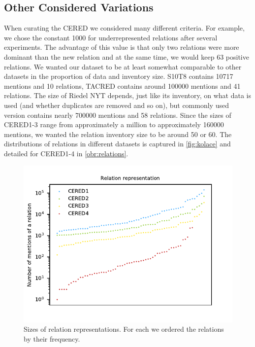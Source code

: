 \subsection{Other Considered Variations}
\label{sec:otherconsideredvariations}
When curating the CERED we considered many different criteria. For example, we chose the constant \num{1000} for underrepresented relations after several experiments. The advantage of this value is that only two relations were more dominant than the new  relation and at the same time, we would keep 63 positive relations. We wanted our dataset to be at least somewhat comparable to other datasets in the proportion of data and inventory size. S10T8 contains \num{10717} mentions and 10 relations, TACRED contains around \num{100000} mentions and 41 relations. The size of Riedel NYT depends, just like its inventory, on what data is used (and whether duplicates are removed and so on), but commonly used version contains nearly \num{700000} mentions and 58 relations. Since the sizes of CERED1-3 range from approximately a million to approximately \num{160000} mentions, we wanted the relation inventory size to be around 50 or 60. The distributions of relations in different datasets is captured in \autoref{fig:kolace} and detailed for CERED1-4 in \autoref{obr:relations}.







\begin{figure}[h]\centering
\includegraphics[scale=1]{./img/Relations1-4_valid}
\caption{Sizes of relation representations. For each we ordered the relations by their frequency.}
\label{obr:relations}
\end{figure}

